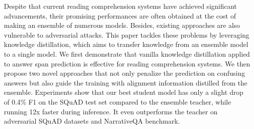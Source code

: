 Despite that current reading comprehension systems have achieved significant advancements, their promising performances are often obtained at the cost of making an ensemble of numerous models. Besides, existing approaches are also vulnerable to adversarial attacks. This paper tackles these problems by leveraging knowledge distillation, which aims to transfer knowledge from an ensemble model to a single model. We first demonstrate that vanilla knowledge distillation applied to answer span prediction is effective for reading comprehension systems. We then propose two novel approaches that not only penalize the prediction on confusing answers but also guide the training with alignment information distilled from the ensemble. Experiments show that our best student model has only a slight drop of 0.4\% F1 on the SQuAD test set compared to the ensemble teacher, while running 12x faster during inference. It even outperforms the teacher on adversarial SQuAD datasets and NarrativeQA benchmark.
